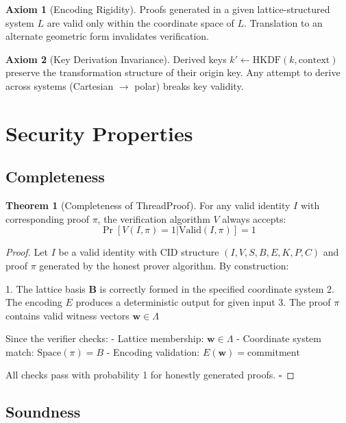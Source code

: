 \documentclass[11pt]{article}
\theoremstyle{definition}
\newtheorem{theorem}{Theorem}[section]
\newtheorem{axiom}{Axiom}[section]
\begin{document}
\begin{axiom}[Encoding Rigidity]
\label{ax:encoding}
Proofs generated in a given lattice-structured system $L$ are valid only within the coordinate space of $L$. Translation to an alternate geometric form invalidates verification.
\end{axiom}

\begin{axiom}[Key Derivation Invariance]
\label{ax:kdf}
Derived keys $k' \leftarrow \text{HKDF}(k, \text{context})$ preserve the transformation structure of their origin key. Any attempt to derive across systems (Cartesian $\rightarrow$ polar) breaks key validity.
\end{axiom}

\section{Security Properties}

\subsection{Completeness}

\begin{theorem}[Completeness of ThreadProof]
For any valid identity $I$ with corresponding proof $\pi$, the verification algorithm $V$ always accepts:
$$\Pr[V(I, \pi) = 1 | \text{Valid}(I, \pi)] = 1$$
\end{theorem}

\begin{proof}
Let $I$ be a valid identity with CID structure $(I, V, S, B, E, K, P, C)$ and proof $\pi$ generated by the honest prover algorithm. By construction:

1. The lattice basis $\mathbf{B}$ is correctly formed in the specified coordinate system
2. The encoding $E$ produces a deterministic output for given input
3. The proof $\pi$ contains valid witness vectors $\mathbf{w} \in \Lambda$

Since the verifier checks:
- Lattice membership: $\mathbf{w} \in \Lambda$
- Coordinate system match: $\text{Space}(\pi) = B$
- Encoding validation: $E(\mathbf{w}) = \text{commitment}$

All checks pass with probability 1 for honestly generated proofs. $\square$
\end{proof}

\subsection{Soundness}
\end{document}

